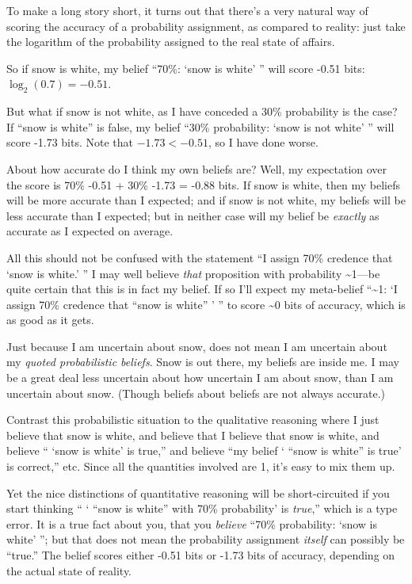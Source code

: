 {
 To make a long story short, it turns out that
there's a very natural way of scoring the accuracy of a
probability assignment, as compared to reality: just take the logarithm
of the probability assigned to the real state of affairs.}

{
 So if snow is white, my belief ``70\%:
`snow is white' '' will
score -0.51 bits: $\log_{2}(0.7) = -0.51$.}

{
 But what if snow is not white, as I have conceded a 30\%
probability is the case? If ``snow is
white'' is false, my belief ``30\%
probability: `snow is not
white' '' will score -1.73 bits. Note
that $-1.73 < -0.51$, so I have done worse.}

{
 About how accurate do I think my own beliefs are? Well, my
expectation over the score is 70\% {\texttimes} -0.51 + 30\%
{\texttimes} -1.73 = -0.88 bits. If snow is white, then my beliefs will
be more accurate than I expected; and if snow is not white, my beliefs
will be less accurate than I expected; but in neither case will my
belief be \textit{exactly} as accurate as I expected on average.}

{
 All this should not be confused with the statement
``I assign 70\% credence that `snow is
white.' '' I may well believe
\textit{that} proposition with probability \~{}1---be quite certain
that this is in fact my belief. If so I'll expect my
meta-belief ``\~{}1: `I assign 70\%
credence that ``snow is white''
' '' to score \~{}0 bits of accuracy,
which is as good as it gets.}

{
 Just because I am uncertain about snow, does not mean I am
uncertain about my \textit{quoted probabilistic beliefs}. Snow is out
there, my beliefs are inside me. I may be a great deal less uncertain
about how uncertain I am about snow, than I am uncertain about snow.
(Though beliefs about beliefs are not always accurate.)}

{
 Contrast this probabilistic situation to the qualitative reasoning
where I just believe that snow is white, and believe that I believe
that snow is white, and believe `` `snow
is white' is true,'' and believe
``my belief ` ``snow is
white'' is true' is
correct,'' etc. Since all the quantities involved are
1, it's easy to mix them up.}

{
 Yet the nice distinctions of quantitative reasoning will be
short-circuited if you start thinking
`` ` ``snow is
white'' with 70\% probability' is
\textit{true},'' which is a type error. It is a true
fact about you, that you \textit{believe} ``70\%
probability: `snow is
white' ''; but that does not mean the
probability assignment \textit{itself} can possibly be
``true.'' The belief scores either
-0.51 bits or -1.73 bits of accuracy, depending on the actual state of
reality.}

